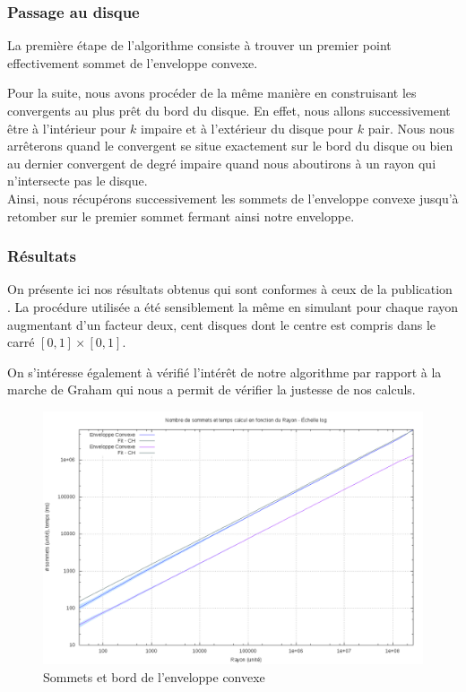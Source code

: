 
\subsubsection{Passage au disque}

La première étape de l'algorithme consiste à trouver un premier point effectivement sommet de l'enveloppe convexe. 

Pour la suite, nous avons procéder de la même manière en construisant les convergents au plus prêt du bord du disque. En effet, nous allons successivement être à l'intérieur pour $k$ impaire et à l'extérieur du disque pour $k$ pair. Nous nous arrêterons quand le convergent se situe exactement sur le bord du disque ou bien au dernier convergent de degré impaire quand nous aboutirons à un rayon qui n'intersecte pas le disque.\\

Ainsi, nous récupérons successivement les sommets de l'enveloppe convexe jusqu'à retomber sur le premier sommet fermant ainsi notre enveloppe.


\subsubsection{Résultats}


On présente ici nos résultats obtenus qui sont conformes à ceux de la publication \cite{HarPeled98}. La procédure utilisée a été sensiblement la même en simulant pour chaque rayon augmentant d'un facteur deux, cent disques dont le centre est compris dans le carré $[0,1]\times[0,1]$.

On s'intéresse également à vérifié l'intérêt de notre algorithme par rapport à la marche de Graham qui nous a permit de vérifier la justesse de nos calculs. 

\begin{figure}[h!]
  \centering
  \includegraphics[width=\linewidth]{fig/4-exi/ch/exi-ch-sommet.png}
  \caption{Sommets et bord de l'enveloppe convexe}
\end{figure}

